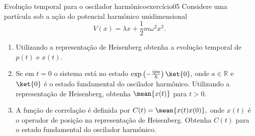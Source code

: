 \begin{exercício}{Evolução temporal para o oscilador harmônico}{exercício05}
    Considere uma partícula sob a ação do potencial harmônico unidimensional
    \begin{equation*}
        V(x) = \lambda x + \frac12 m \omega^2 x^2.
    \end{equation*}
    \begin{enumerate}[label=(\alph*)]
        \item Utilizando a representação de Heisenberg obtenha a evolução temporal de \(p(t)\) e \(x(t)\).
        \item Se em \(t = 0\) o sistema está no estado \(\exp\left(-\frac{ipa}{\hbar}\right)\ket{0},\) onde \(a \in \mathbb{R}\) e \(\ket{0}\) é o estado fundamental do oscilador harmônico. Utilizando a representação de Heisenberg, obtenha \(\mean{x(t)}\) para \(t > 0\).
        \item A função de correlação é definida por \(C(t) = \mean{x(t)x(0)},\) onde \(x(t)\) é o operador de posição na representação de Heisenberg. Obtenha \(C(t)\) para o estado fundamental do oscilador harmônico.
    \end{enumerate}
\end{exercício}
